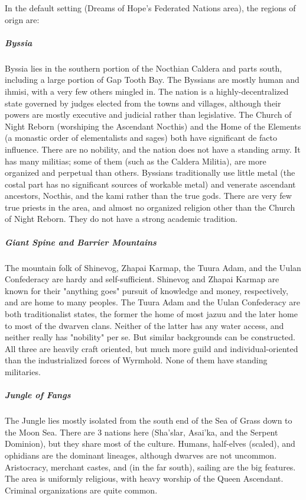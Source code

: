 In the default setting (Dreams of Hope's Federated Nations area), the regions of orign are:

\subparagraph*{Byssia}
Byssia lies in the southern portion of the Nocthian Caldera and parts south, including a large portion of Gap Tooth Bay. The Byssians are mostly human and ihmisi, with a very few others mingled in. The nation is a highly-decentralized state governed by judges elected from the towns and villages, although their powers are mostly executive and judicial rather than legislative. The Church of Night Reborn (worshiping the Ascendant Nocthis) and the Home of the Elements (a monastic order of elementalists and sages) both have significant de facto influence. There are no nobility, and the nation does not have a standing army. It has many militias; some of them (such as the Caldera Militia), are more organized and perpetual than others. Byssians traditionally use little metal (the costal part has no significant sources of workable metal) and venerate ascendant ancestors, Nocthis, and the kami rather than the true gods. There are very few true priests in the area, and almost no organized religion other than the Church of Night Reborn. They do not have a strong academic tradition.

\subparagraph*{Giant Spine and Barrier Mountains}
The mountain folk of Shinevog, Zhapai Karmap, the Tuura Adam, and the Uulan Confederacy are hardy and self-sufficient. Shinevog and Zhapai Karmap are known for their "anything goes" pursuit of knowledge and money, respectively, and are home to many peoples. The Tuura Adam and the Uulan Confederacy are both traditionalist states, the former the home of most jazuu and the later home to most of the dwarven clans. Neither of the latter has any water access, and neither really has "nobility" per se. But similar backgrounds can be constructed. All three are heavily craft oriented, but much more guild and individual-oriented than the industrialized forces of Wyrmhold. None of them have standing militaries.

\subparagraph*{Jungle of Fangs}
The Jungle lies mostly isolated from the south end of the Sea of Grass down to the Moon Sea. There are 3 nations here (Sha'slar, Asai'ka, and the Serpent Dominion), but they share most of the culture. Humans, half-elves (scaled), and ophidians are the dominant lineages, although dwarves are not uncommon. Aristocracy, merchant castes, and (in the far south), sailing are the big features. The area is uniformly religious, with heavy worship of the Queen Ascendant. Criminal organizations are quite common.

